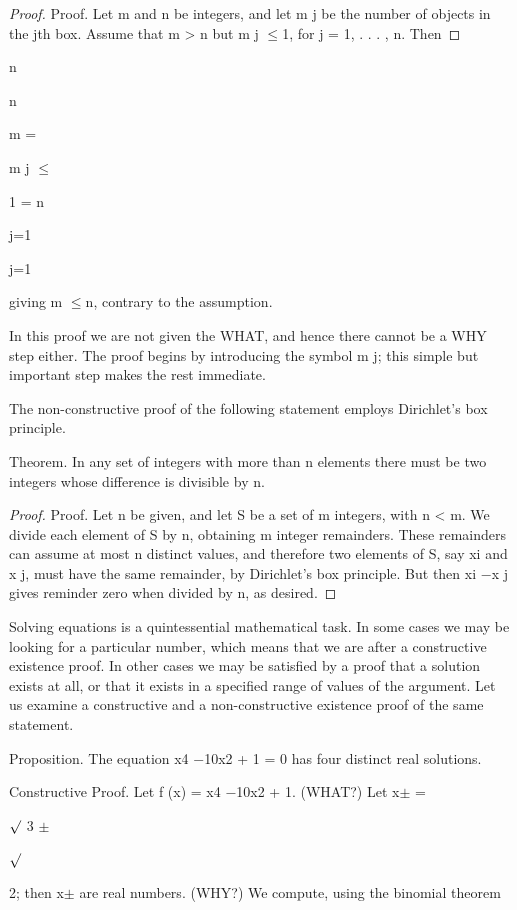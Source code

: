 \documentclass[11pt]{article}
\theoremstyle{plain}
\theoremstyle{definition}
\begin{document}
\begin{proof}
Proof. Let m and n be integers, and let m j be the number of objects in the jth box. Assume that m > n but m j $\leq$1, for j = 1, . . . , n. Then
\end{proof}

n

n

m =

m j $\leq$

1 = n

j=1

j=1

giving m $\leq$n, contrary to the assumption. 

In this proof we are not given the WHAT, and hence there cannot be a WHY step either. The proof begins by introducing the symbol m j; this simple but important step makes the rest immediate.

The non-constructive proof of the following statement employs Dirichlet's box principle.

Theorem. In any set of integers with more than n elements there must be two integers whose difference is divisible by n.

\begin{proof}
Proof. Let n be given, and let S be a set of m integers, with n < m. We divide each element of S by n, obtaining m integer remainders. These remainders can assume at most n distinct values, and therefore two elements of S, say xi and x j, must have the same remainder, by Dirichlet's box principle. But then xi $-$x j gives reminder zero when divided by n, as desired. 
\end{proof}

Solving equations is a quintessential mathematical task. In some cases we may be looking for a particular number, which means that we are after a constructive existence proof. In other cases we may be satisfied by a proof that a solution exists at all, or that it exists in a specified range of values of the argument. Let us examine a constructive and a non-constructive existence proof of the same statement.

Proposition. The equation x4 $-$10x2 + 1 = 0 has four distinct real solutions.

Constructive Proof. Let f (x) = x4 $-$10x2 + 1. (WHAT?) Let x$\pm$ =

$\surd$ 3 $\pm$

$\surd$

2; then x$\pm$ are real numbers. (WHY?) We compute, using the binomial theorem
\end{document}
